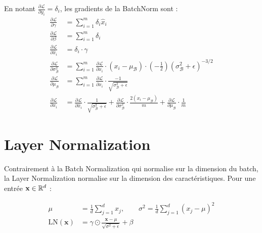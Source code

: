 \begin{proposition}
En notant $\frac{\partial \mathcal{L}}{\partial y_i} = \delta_i$, les gradients
de la BatchNorm sont :
\begin{align}
\frac{\partial \mathcal{L}}{\partial \gamma}
  &= \sum_{i=1}^m \delta_i \hat{x}_i \\
\frac{\partial \mathcal{L}}{\partial \beta}
  &= \sum_{i=1}^m \delta_i \\
\frac{\partial \mathcal{L}}{\partial \hat{x}_i}
  &= \delta_i \cdot \gamma \\
\frac{\partial \mathcal{L}}{\partial \sigma_{\mathcal{B}}^2}
  &= \sum_{i=1}^m \frac{\partial \mathcal{L}}{\partial \hat{x}_i}
     \cdot (x_i - \mu_{\mathcal{B}})
     \cdot \left(-\frac{1}{2}\right)(\sigma_{\mathcal{B}}^2 + \epsilon)^{-3/2} \\
\frac{\partial \mathcal{L}}{\partial \mu_{\mathcal{B}}}
  &= \sum_{i=1}^m \frac{\partial \mathcal{L}}{\partial \hat{x}_i}
     \cdot \frac{-1}{\sqrt{\sigma_{\mathcal{B}}^2 + \epsilon}} \\
\frac{\partial \mathcal{L}}{\partial x_i}
  &= \frac{\partial \mathcal{L}}{\partial \hat{x}_i}
     \cdot \frac{1}{\sqrt{\sigma_{\mathcal{B}}^2 + \epsilon}}
   + \frac{\partial \mathcal{L}}{\partial \sigma_{\mathcal{B}}^2}
     \cdot \frac{2(x_i - \mu_{\mathcal{B}})}{m}
   + \frac{\partial \mathcal{L}}{\partial \mu_{\mathcal{B}}} \cdot \frac{1}{m}
\end{align}
\end{proposition}

\section{Layer Normalization}
\label{sec:layernorm}

Contrairement \`a la Batch Normalization qui normalise sur la dimension du
batch, la Layer Normalization \cite{ba2016layer} normalise sur la dimension
des caract\'eristiques. Pour une entr\'ee $\mathbf{x} \in \mathbb{R}^d$ :

\begin{formules}[title=\textbf{Layer Normalization}]
\begin{align}
\mu &= \frac{1}{d} \sum_{j=1}^d x_j, \qquad
\sigma^2 = \frac{1}{d} \sum_{j=1}^d (x_j - \mu)^2 \\
\text{LN}(\mathbf{x}) &= \gamma \odot \frac{\mathbf{x} - \mu}{\sqrt{\sigma^2 + \epsilon}} + \beta
\end{align}
\end{formules}

